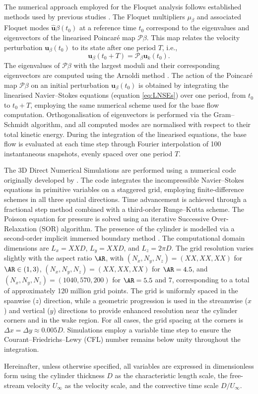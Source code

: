 The numerical approach employed for the Floquet analysis follows established methods used by previous studies \citep[e.g.,][]{barkley-henderson-1996}. The Floquet multipliers $\mu_\beta$ and associated Floquet modes $\hat{\boldsymbol{u}}\beta(t_0)$ at a reference time $t_0$ correspond to the eigenvalues and eigenvectors of the linearised Poincaré map $\mathcal{P}\beta$. This map relates the velocity perturbation $\boldsymbol{u}_\beta(t_0)$ to its state after one period $T$, i.e.,
%
\begin{equation}
\bm{u}_\beta(t_0+T) = \mathcal{P}_\beta \bm{u}_k(t_0).
\end{equation}
%
The eigenvalues of $\mathcal{P}\beta$ with the largest moduli and their corresponding eigenvectors are computed using the Arnoldi method \citep{saad-2011}. The action of the Poincaré map $\mathcal{P}\beta$ on an initial perturbation $\boldsymbol{u}_\beta(t_0)$ is obtained by integrating the linearised Navier--Stokes equations (equation \ref{eq:LNSEs}) over one period, from $t_0$ to $t_0 + T$, employing the same numerical scheme used for the base flow computation. Orthogonalisation of eigenvectors is performed via the Gram–Schmidt algorithm, and all computed modes are normalised with respect to their total kinetic energy. During the integration of the linearised equations, the base flow is evaluated at each time step through Fourier interpolation of 100 instantaneous snapshots, evenly spaced over one period $T$.

The 3D Direct Numerical Simulations are performed using a numerical code originally developed by \cite{luchini-2013}. The code integrates the incompressible Navier--Stokes equations in primitive variables on a staggered grid, employing finite-difference schemes in all three spatial directions. Time advancement is achieved through a fractional step method combined with a third-order Runge–Kutta scheme. The Poisson equation for pressure is solved using an iterative Successive Over-Relaxation (SOR) algorithm. The presence of the cylinder is modelled via a second-order implicit immersed boundary method \citep{luchini-etal-2025}.
%
The computational domain dimensions are $L_x = XXD$, $L_y = XXD$, and $L_z = 2\pi D$. The grid resolution varies slightly with the aspect ratio $\AR$, with $(N_x, N_y, N_z) = (XX, XX, XX)$ for $\AR \in (1,3)$, $(N_x, N_y, N_z) = (XX, XX, XX)$ for $\AR = 4.5$, and $(N_x, N_y, N_z) = (1040, 570, 200)$ for $\AR = 5.5$ and $7$, corresponding to a total of approximately 120 million grid points. The grid is uniformly spaced in the spanwise ($z$) direction, while a geometric progression is used in the streamwise ($x$) and vertical ($y$) directions to provide enhanced resolution near the cylinder corners and in the wake region. For all cases, the grid spacing at the corners is $\Delta x = \Delta y \approx 0.005D$. Simulations employ a variable time step to ensure the Courant–Friedrichs–Lewy (CFL) number remains below unity throughout the integration. 

Hereinafter, unless otherwise specified, all variables are expressed in dimensionless form using the cylinder thickness $D$ as the characteristic length scale, the free-stream velocity $U_\infty$ as the velocity scale, and the convective time scale $D/U_\infty$.
